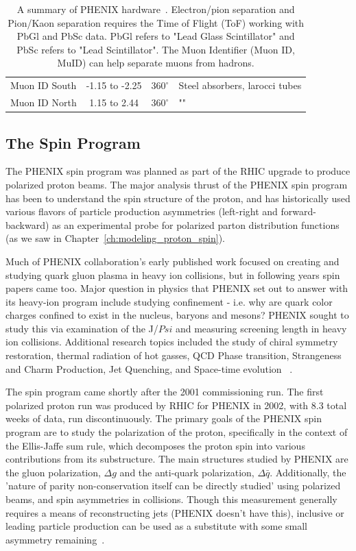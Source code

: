 \begin{table}
\begin{tabular}{l c c l}
    Muon ID South & -1.15 to -2.25 & $360^{\circ}$ & Steel absorbers, larocci tubes \\
    Muon ID North & 1.15 to 2.44   & $360^{\circ}$ & "" \\
    \bottomrule 
  \end{tabular}
  \caption{
    A summary of PHENIX hardware~\cite{Adcox2003}. Electron/pion separation and
    Pion/Kaon separation requires the Time of Flight (ToF) working with PbGl and
    PbSc data. PbGl refers to "Lead Glass Scintillator" and PbSc refers to "Lead
    Scintillator". The Muon Identifier (Muon ID, MuID) can help separate muons
    from hadrons. 
  }
  \label{tab:phenix_detector_summary}
\end{table}

\subsection{The Spin Program}
The PHENIX spin program was planned as part of the RHIC upgrade to produce
polarized proton beams. The major analysis thrust of the PHENIX spin program has
been to understand the spin structure of the proton, and has historically used
various flavors of particle production asymmetries (left-right and
forward-backward) as an experimental probe for polarized parton distribution
functions (as we saw in Chapter~\ref{ch:modeling_proton_spin}).

Much of PHENIX collaboration's early published work focused on creating and
studying quark gluon plasma in heavy ion collisions, but in following years spin
papers came too. Major question in physics that PHENIX set out to answer with
its heavy-ion program include studying confinement - i.e.  why are quark color
charges confined to exist in the nucleus, baryons and mesons? PHENIX sought to
study this via examination of the J/$Psi$ and measuring screening length in
heavy ion collisions. Additional research topics included the study of chiral
symmetry restoration, thermal radiation of hot gasses, QCD Phase transition,
Strangeness and Charm Production, Jet Quenching, and Space-time
evolution~\cite{Nagamiya1994} .

The spin program came shortly after the 2001 commissioning run. The first
polarized proton run was produced by RHIC for PHENIX in 2002, with 8.3 total
weeks of data, run discontinuously. The primary goals of the PHENIX spin
program are to study the polarization of the proton, specifically in the context
of the Ellis-Jaffe sum rule, which decomposes the proton spin into various
contributions from its substructure. The main structures studied by PHENIX are
the gluon polarization, $\Delta g$ and the anti-quark polarization, $\Delta
\bar{q}$. Additionally, the 'nature of parity non-conservation itself can be
directly studied' using polarized beams, and spin asymmetries in collisions.
Though this measurement generally requires a means of reconstructing jets
(PHENIX doesn't have this), inclusive or leading particle production can be used
as a substitute with some small asymmetry
remaining~\cite{PHENIXCollaboration1998}.

